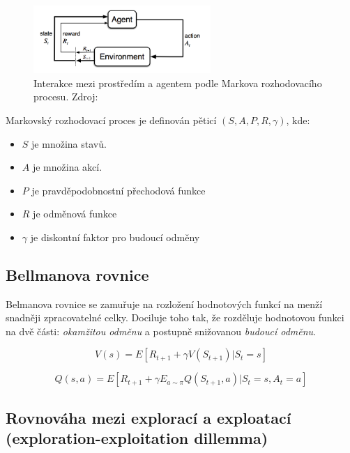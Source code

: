 \begin{figure}[hbt]
	\centering
	\includegraphics[width=0.6\textwidth]{obrazky-figures/RL_basics.png}
	\caption{Interakce mezi prostředím a agentem podle Markova rozhodovacího procesu.
  Zdroj:\cite{RL_basics}}
\end{figure}

\begin{definition}
  
Markovský rozhodovací proces je definován pěticí $(S, A, P, R, \gamma)$\cite{RL_basics}, kde:

\begin{itemize}
\item $S$ je množina stavů.

\item $A$ je množina akcí.
\item $P$ je pravděpodobnostní přechodová funkce
\item $R$ je odměnová funkce
\item $\gamma$ je diskontní faktor pro budoucí odměny
\end{itemize}
\end{definition}

\subsection{Bellmanova rovnice}

Belmanova rovnice se zamuřuje na rozložení hodnotových funkcí na menží snadněji zpracovatelné celky.
Dociluje toho tak, že rozděluje hodnotovou funkci na dvě části: \emph{okamžitou odměnu} a postupně snižovanou \emph{budoucí odměnu}.

\begin{equation}
  V(s) = E[R_{t+1} + \gamma V(S_{t+1}) | S_t = s]
\end{equation}

\begin{equation}
  Q(s, a) = E[R_{t+1} + \gamma E_{a\sim\pi}Q(S_{t+1}, a) | S_t = s, A_t = a]
\end{equation}

\subsection{Rovnováha mezi explorací a exploatací (exploration-exploitation dillemma)}
\label{sec:exploration-exploitation-dillemma}

